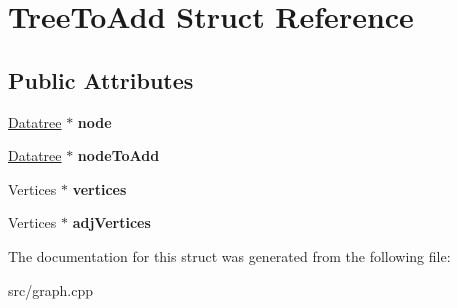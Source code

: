 \hypertarget{structTreeToAdd}{\section{Tree\-To\-Add Struct Reference}
\label{structTreeToAdd}
}
\subsection*{Public Attributes}
\begin{DoxyCompactItemize}
\item 
\hypertarget{structTreeToAdd_abebc54c95ff5f9c39b5c888c48e20cc7}{\hyperlink{classDatatree}{Datatree} $\ast$ {\bfseries node}}\label{structTreeToAdd_abebc54c95ff5f9c39b5c888c48e20cc7}

\item 
\hypertarget{structTreeToAdd_aa77d6e9cc086cdda22594aa24cdcf747}{\hyperlink{classDatatree}{Datatree} $\ast$ {\bfseries node\-To\-Add}}\label{structTreeToAdd_aa77d6e9cc086cdda22594aa24cdcf747}

\item 
\hypertarget{structTreeToAdd_a5c6876f0c789a47f670096f88bbd4daf}{Vertices $\ast$ {\bfseries vertices}}\label{structTreeToAdd_a5c6876f0c789a47f670096f88bbd4daf}

\item 
\hypertarget{structTreeToAdd_ac68944fc8f68753e3088ae9d2110ca92}{Vertices $\ast$ {\bfseries adj\-Vertices}}\label{structTreeToAdd_ac68944fc8f68753e3088ae9d2110ca92}

\end{DoxyCompactItemize}


The documentation for this struct was generated from the following file\-:\begin{DoxyCompactItemize}
\item 
src/graph.\-cpp\end{DoxyCompactItemize}
